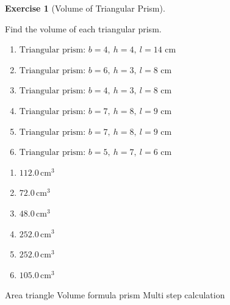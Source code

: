 \documentclass[
  letterpaper,
  DIV=11,
  numbers=noendperiod]{scrreprt}
\theoremstyle{definition}
\newtheorem{exercise}{Exercise}[chapter]
\theoremstyle{remark}
\begin{document}
\begin{exercise}[Volume of Triangular
Prism]\protect\hypertarget{exr-vol-3}{}\label{exr-vol-3}

Find the volume of each triangular prism.

\begin{enumerate}
\def\labelenumi{\alph{enumi})}
\item
  \(\text{Triangular prism: }b=4,\ h=4,\ l=14\text{ cm}\)
\item
  \(\text{Triangular prism: }b=6,\ h=3,\ l=8\text{ cm}\)
\item
  \(\text{Triangular prism: }b=4,\ h=3,\ l=8\text{ cm}\)
\item
  \(\text{Triangular prism: }b=7,\ h=8,\ l=9\text{ cm}\)
\item
  \(\text{Triangular prism: }b=7,\ h=8,\ l=9\text{ cm}\)
\item
  \(\text{Triangular prism: }b=5,\ h=7,\ l=6\text{ cm}\)
\end{enumerate}

\begin{tcolorbox}[enhanced jigsaw, opacitybacktitle=0.6, coltitle=black, arc=.35mm, colframe=quarto-callout-tip-color-frame, colback=white, bottomrule=.15mm, left=2mm, colbacktitle=quarto-callout-tip-color!10!white, titlerule=0mm, opacityback=0, title=\textcolor{quarto-callout-tip-color}{\faLightbulb}\hspace{0.5em}{🔍 View Solution}, leftrule=.75mm, breakable, rightrule=.15mm, bottomtitle=1mm, toptitle=1mm, toprule=.15mm]

\begin{enumerate}
\def\labelenumi{\alph{enumi})}
\item
  \(112.0\,\text{cm}^{3}\)
\item
  \(72.0\,\text{cm}^{3}\)
\item
  \(48.0\,\text{cm}^{3}\)
\item
  \(252.0\,\text{cm}^{3}\)
\item
  \(252.0\,\text{cm}^{3}\)
\item
  \(105.0\,\text{cm}^{3}\)
\end{enumerate}

\end{tcolorbox}

{Area triangle} {Volume formula prism} {Multi step calculation}

\end{exercise}
\end{document}
